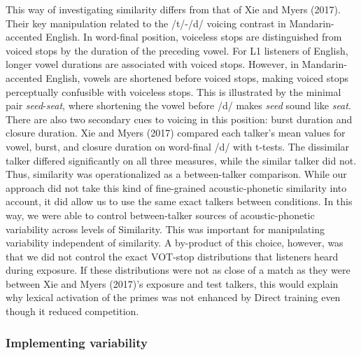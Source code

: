 \documentclass[
  12pt,
  twoside]{article}
\begin{document}
This way of investigating similarity differs from that of Xie and Myers (2017).
Their key manipulation related to the /t/-/d/ voicing contrast in Mandarin-accented English.
In word-final position, voiceless stops are distinguished from voiced stops by the duration of the preceding vowel.
For L1 listeners of English, longer vowel durations are associated with voiced stops.
However, in Mandarin-accented English, vowels are shortened before voiced stops, making voiced stops perceptually confusible with voiceless stops.
This is illustrated by the minimal pair \emph{seed}-\emph{seat}, where shortening the vowel before /d/ makes \emph{seed} sound like \emph{seat}.
There are also two secondary cues to voicing in this position: burst duration and closure duration.
Xie and Myers (2017) compared each talker's mean values for vowel, burst, and closure duration on word-final /d/ with t-tests.
The dissimilar talker differed significantly on all three measures, while the similar talker did not.
Thus, similarity was operationalized as a between-talker comparison.
While our approach did not take this kind of fine-grained acoustic-phonetic similarity into account, it did allow us to use the same exact talkers between conditions.
In this way, we were able to control between-talker sources of acoustic-phonetic variability across levels of Similarity.
This was important for manipulating variability independent of similarity.
A by-product of this choice, however, was that we did not control the exact VOT-stop distributions that listeners heard during exposure.
If these distributions were not as close of a match as they were between Xie and Myers (2017)'s exposure and test talkers, this would explain why lexical activation of the primes was not enhanced by Direct training even though it reduced competition.

\hypertarget{discuss-var}{%
\subsubsection{Implementing variability}\label{discuss-var}}
\end{document}

